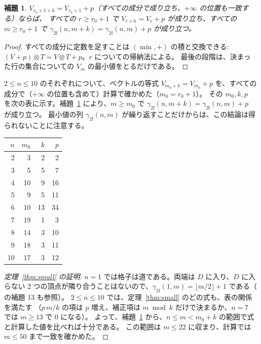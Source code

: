 \documentclass[11pt]{ltjsarticle}
\newtheorem{lemma}[theorem]{補題}
\theoremstyle{definition}
\newcommand{\gf}{\gamma_{2\mathrm{f}}}
\begin{document}
\begin{lemma}\label{lem:vector-period}
$V_{r_0+1+k}=V_{r_0+1}+p$（すべての成分で成り立ち、$+\infty$ の位置も一致する）ならば、
すべての $r\ge r_0+1$ で $V_{r+k}=V_r+p$ が成り立ち、すべての $m\ge r_0+1$ で $\gf(n,m+k)=\gf(n,m)+p$ が成り立つ。
\end{lemma}

\begin{proof}
すべての成分に定数を足すことは $(\min,+)$ の積と交換できる: $(V+p)\otimes T=V\otimes T+p$。$r$ についての帰納法による。
最後の段階は、決まった行の集合についての $V_m$ の最小値をとるだけである。
\end{proof}

$2\le n\le 10$ のそれぞれについて、ベクトルの等式 $V_{m_0+k}=V_{m_0}+p$ を、すべての成分で（$+\infty$ の位置も含めて）計算で確かめた（$m_0=r_0+1$）。
その $m_0,k,p$ を次の表に示す。補題~\ref{lem:vector-period} により、$m\ge m_0$ で $\gf(n,m+k)=\gf(n,m)+p$ が成り立つ。
最小値の列 $\gf(n,m)$ が繰り返すことだけからは、この結論は得られないことに注意する。

\begin{center}
\begin{tabular}{rrrr}
\toprule
$n$ & $m_0$ & $k$ & $p$\\
\midrule
2 & 3 & 2 & 2\\
3 & 5 & 5 & 7\\
4 & 10 & 9 & 16\\
5 & 9 & 5 & 11\\
6 & 10 & 13 & 34\\
7 & 19 & 1 & 3\\
8 & 14 & 3 & 10\\
9 & 18 & 3 & 11\\
10 & 17 & 3 & 12\\
\bottomrule
\end{tabular}
\end{center}

\begin{proof}[定理~\ref{thm:small} の証明]
$n=1$ では格子は道である。両端は $D$ に入り、$D$ に入らない 2 つの頂点が隣り合うことはないので、$\gf(1,m)=\lfloor m/2\rfloor+1$ である（\cite{Hung} の補題 13 も参照）。
$2\le n\le 10$ では、定理~\ref{thm:small} のどの式も、表の関係を満たす
（$p\,m/k$ の項は $p$ 増え、補正項は $m \bmod k$ だけで決まるか、$n=7$ では $m\ge 13$ で $0$ になる）。
よって、補題~\ref{lem:vector-period} から、$n\le m< m_0+k$ の範囲で式と計算した値を比べれば十分である。
この範囲は $m\le 22$ に収まり、計算では $m\le 50$ まで一致を確かめた。
\end{proof}
\end{document}
